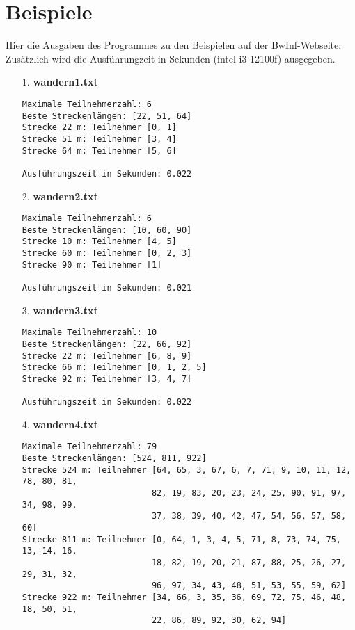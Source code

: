 \documentclass[a4paper,10pt,ngerman]{scrartcl}
\begin{document}
\section{Beispiele}
Hier die Ausgaben des Programmes zu den Beispielen auf der BwInf-Webseite:
Zusätzlich wird die Ausführungzeit in Sekunden (intel i3-12100f) ausgegeben.
\begin{itemize}
  \item [1.] \textbf{wandern1.txt}
  \begin{verbatim}
Maximale Teilnehmerzahl: 6
Beste Streckenlängen: [22, 51, 64]
Strecke 22 m: Teilnehmer [0, 1]
Strecke 51 m: Teilnehmer [3, 4]
Strecke 64 m: Teilnehmer [5, 6]

Ausführungszeit in Sekunden: 0.022
  \end{verbatim}
  \item [2.] \textbf{wandern2.txt}
  \begin{verbatim}
Maximale Teilnehmerzahl: 6
Beste Streckenlängen: [10, 60, 90]
Strecke 10 m: Teilnehmer [4, 5]
Strecke 60 m: Teilnehmer [0, 2, 3]
Strecke 90 m: Teilnehmer [1]

Ausführungszeit in Sekunden: 0.021
  \end{verbatim}
  \item [3.] \textbf{wandern3.txt}
  \begin{verbatim}
Maximale Teilnehmerzahl: 10
Beste Streckenlängen: [22, 66, 92]
Strecke 22 m: Teilnehmer [6, 8, 9]
Strecke 66 m: Teilnehmer [0, 1, 2, 5]
Strecke 92 m: Teilnehmer [3, 4, 7]

Ausführungszeit in Sekunden: 0.022
  \end{verbatim}
  \item [4.] \textbf{wandern4.txt}
  \begin{verbatim}
Maximale Teilnehmerzahl: 79
Beste Streckenlängen: [524, 811, 922]
Strecke 524 m: Teilnehmer [64, 65, 3, 67, 6, 7, 71, 9, 10, 11, 12, 78, 80, 81, 
                          82, 19, 83, 20, 23, 24, 25, 90, 91, 97, 34, 98, 99, 
                          37, 38, 39, 40, 42, 47, 54, 56, 57, 58, 60]
Strecke 811 m: Teilnehmer [0, 64, 1, 3, 4, 5, 71, 8, 73, 74, 75, 13, 14, 16, 
                          18, 82, 19, 20, 21, 87, 88, 25, 26, 27, 29, 31, 32, 
                          96, 97, 34, 43, 48, 51, 53, 55, 59, 62]
Strecke 922 m: Teilnehmer [34, 66, 3, 35, 36, 69, 72, 75, 46, 48, 18, 50, 51, 
                          22, 86, 89, 92, 30, 62, 94]


\end{verbatim}
\end{itemize}
\end{document}
